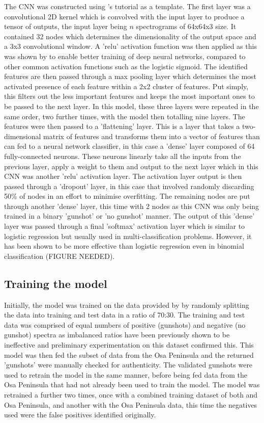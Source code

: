 The CNN was constructed using \cite{Chollet2016}'s tutorial as a template. The first layer was a convolutional 2D kernel which is convolved with the input layer to produce a tensor of outputs, the input layer being $n$ spectrograms of 64x64x3 size. It contained 32 nodes which determines the dimensionality of the output space and a 3x3 convolutional window. A 'relu' activation function was then applied as this was shown by \cite{Glorot2011} to enable better training of deep neural networks, compared to other common activation functions such as the logistic sigmoid. The identified features are then passed through a max pooling layer which determines the most activated presence of each feature within a 2x2 cluster of features. Put simply, this filters out the less important features and keeps the most important ones to be passed to the next layer. In this model, these three layers were repeated in the same order, two further times, with the model then totalling nine layers. The features were then passed to a 'flattening' layer. This is a layer that takes a two-dimensional matrix of features and transforms them into a vector of features than can fed to a neural network classifier, in this case a 'dense' layer composed of 64 fully-connected neurons. These neurons linearly take all the inputs from the previous layer, apply a weight to them and output to the next layer which in this CNN was another 'relu' activation layer. The activation layer output is then passed through a 'dropout' layer, in this case that involved randomly discarding 50\% of nodes in an effort to minimise overfitting. The remaining nodes are put through another 'dense' layer, this time with 2 nodes as this CNN was only being trained in a binary 'gunshot' or 'no gunshot' manner. The output of this 'dense' layer was passed through a final 'softmax' activation layer which is similar to logistic regression but usually used in multi-classification problems. However, it has been shown to be more effective than logistic regression even in binomial classification (FIGURE NEEDED).

\subsection{Training the model}
Initially, the model was trained on the data provided by \cite{Hill2018} by randomly splitting the data into training and test data in a ratio of 70:30. The training and test data was comprised of equal numbers of positive (gunshots) and negative (no gunshot) spectra as imbalanced ratios have been previously shown to be ineffective \citep{Kim2018} and preliminary experimentation on this dataset confirmed this. This model was then fed the subset of data from the Osa Peninsula and the returned 'gunshots' were manually checked for authenticity. The validated gunshots were used to retrain the model in the same manner, before being fed data from the Osa Peninsula that had not already been used to train the model. The model was retrained a further two times, once with a combined training dataset of both \cite{Hill2018} and Osa Peninsula, and another with the Osa Peninsula data, this time the negatives used were the false positives identified originally.

